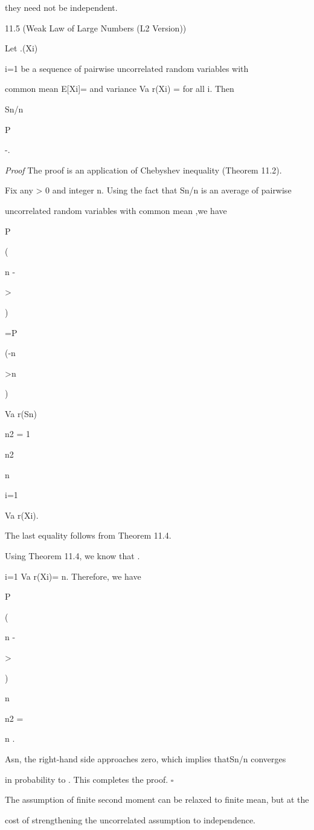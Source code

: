 they need not be independent.

\begin{thmbox}{11.5 (Weak Law of Large Numbers (L2 Version))}
\end{thmbox}

Let .(Xi)\infty

i=1 be a sequence of pairwise uncorrelated random variables with

common mean E[Xi]= \mu and variance Va r(Xi) =  for all i. Then

Sn/n

P

-\to \mu.

\textit{Proof} The proof is an application of Chebyshev inequality (Theorem 11.2).

Fix any \epsilon> 0 and integer n. Using the fact that Sn/n is an average of pairwise

uncorrelated random variables with common mean \mu,we have

P

(\vert\vertSn

n -\mu

\vert\vert >\epsilon

)

=P

(\vert\vertSn -n\mu

\vert\vert >n \epsilon

)

\leq Va r(Sn)

n2 = 1

n2

n\sum

i=1

Va r(Xi).

The last equality follows from Theorem 11.4.

Using Theorem 11.4, we know that .

\sumn

i=1 Va r(Xi)= n. Therefore, we have

P

( \vert\vert\vertSn

n -\mu

\vert\vert\vert >\epsilon

)

\leq n

n2 = 

n .

Asn\to\infty , the right-hand side approaches zero, which implies thatSn/n converges

in probability to \mu. This completes the proof. \hfill $\square$

The assumption of finite second moment can be relaxed to finite mean, but at the

cost of strengthening the uncorrelated assumption to independence.
